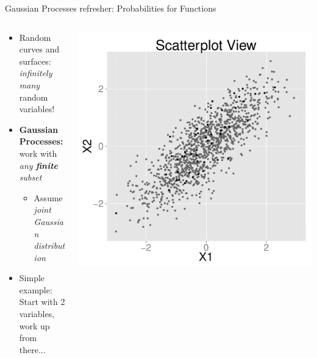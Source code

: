 \documentclass[final,t]{beamer}\usepackage[]{graphicx}\usepackage[]{color}
\makeatletter
\def\maxwidth{ %
  \ifdim\Gin@nat@width>\linewidth
    \linewidth
  \else
    \Gin@nat@width
  \fi
}
\newenvironment{knitrout}{}{} %
\makeatother
\begin{document}
\begin{frame}[fragile]
  \begin{block}{Gaussian Processes refresher: Probabilities for Functions}
    \begin{columns}[T]
      \begin{column}{0.16\linewidth}
        \begin{itemize}
          \item Random curves and surfaces: \\
            \textit{infinitely many} random variables!
          \item \textbf{Gaussian Processes:} \\
            work with \textit{any \textbf{finite} subset}
            \begin{itemize}
              \item Assume \textit{joint Gaussian distribution}
            \end{itemize}
          \item Simple example: \\
            Start with 2 variables, \\
            work up from there...
        \end{itemize}
      \end{column}
      \begin{column}{0.12\linewidth}
\begin{knitrout}
\color{fgcolor}
\includegraphics[width=\maxwidth]{figure/scatterplot_function} 


\end{knitrout}
\end{column}
\end{columns}
\end{block}
\end{frame}
\end{document}

